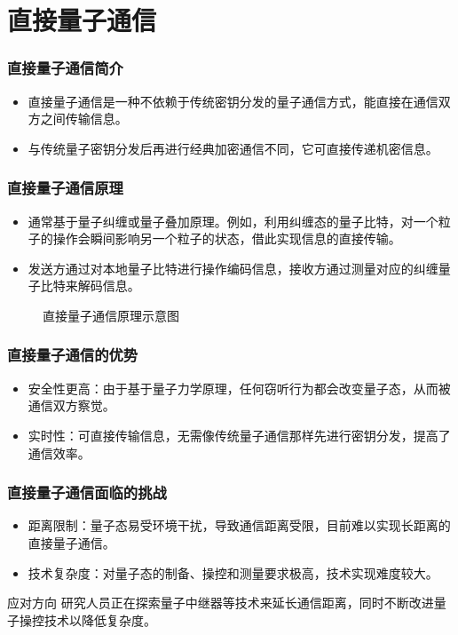 \section{直接量子通信}
\begin{frame}
    \frametitle{直接量子通信简介}
    \begin{itemize}
        \item 直接量子通信是一种不依赖于传统密钥分发的量子通信方式，能直接在通信双方之间传输信息。
        \item 与传统量子密钥分发后再进行经典加密通信不同，它可直接传递机密信息。
    \end{itemize}
\end{frame}

\begin{frame}
    \frametitle{直接量子通信原理}
    \begin{itemize}
        \item 通常基于量子纠缠或量子叠加原理。例如，利用纠缠态的量子比特，对一个粒子的操作会瞬间影响另一个粒子的状态，借此实现信息的直接传输。
        \item 发送方通过对本地量子比特进行操作编码信息，接收方通过测量对应的纠缠量子比特来解码信息。
    \end{itemize}
    \begin{figure}
        \centering
        \caption{直接量子通信原理示意图}
    \end{figure}
\end{frame}

\begin{frame}
    \frametitle{直接量子通信的优势}
    \begin{itemize}
        \item 安全性更高：由于基于量子力学原理，任何窃听行为都会改变量子态，从而被通信双方察觉。
        \item 实时性：可直接传输信息，无需像传统量子通信那样先进行密钥分发，提高了通信效率。
    \end{itemize}
\end{frame}

\begin{frame}
    \frametitle{直接量子通信面临的挑战}
    \begin{itemize}
        \item 距离限制：量子态易受环境干扰，导致通信距离受限，目前难以实现长距离的直接量子通信。
        \item 技术复杂度：对量子态的制备、操控和测量要求极高，技术实现难度较大。
    \end{itemize}
    \begin{alertblock}{应对方向}
        研究人员正在探索量子中继器等技术来延长通信距离，同时不断改进量子操控技术以降低复杂度。
    \end{alertblock}
\end{frame}

